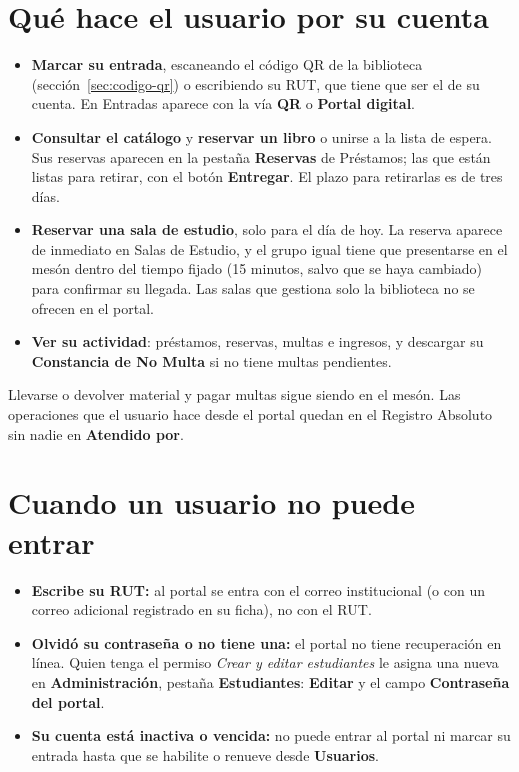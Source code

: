 \documentclass[11pt,a4paper]{report}
\begin{document}

\section{Qué hace el usuario por su cuenta}

\begin{itemize}
  \item \textbf{Marcar su entrada}, escaneando el código QR de la
  biblioteca (sección~\ref{sec:codigo-qr}) o escribiendo su RUT, que tiene
  que ser el de su cuenta. En Entradas aparece con la vía \textbf{QR} o
  \textbf{Portal digital}.
  \item \textbf{Consultar el catálogo} y \textbf{reservar un libro} o
  unirse a la lista de espera. Sus reservas aparecen en la pestaña
  \textbf{Reservas} de Préstamos; las que están listas para retirar, con el
  botón \textbf{Entregar}. El plazo para retirarlas es de tres días.
  \item \textbf{Reservar una sala de estudio}, solo para el día de hoy. La reserva aparece de inmediato en
  Salas de Estudio, y el grupo igual tiene que presentarse en el mesón
  dentro del tiempo fijado (15 minutos, salvo que se haya cambiado) para confirmar su llegada. Las salas que
  gestiona solo la biblioteca no se ofrecen en el portal.
  \item \textbf{Ver su actividad}: préstamos, reservas, multas e ingresos,
  y descargar su \textbf{Constancia de No Multa} si no tiene multas
  pendientes.
\end{itemize}

Llevarse o devolver material y pagar multas sigue siendo en el mesón. Las
operaciones que el usuario hace desde el portal quedan en el Registro
Absoluto sin nadie en \textbf{Atendido por}.

\section{Cuando un usuario no puede entrar}
\label{sec:portal-no-entra}

\begin{itemize}
  \item \textbf{Escribe su RUT:} al portal se entra con el correo
  institucional (o con un correo adicional registrado en su ficha), no con
  el RUT.
  \item \textbf{Olvidó su contraseña o no tiene una:} el portal no tiene
  recuperación en línea. Quien tenga el permiso \textit{Crear y editar
  estudiantes} le asigna una nueva en \textbf{Administración}, pestaña
  \textbf{Estudiantes}: \textbf{Editar} y el campo \textbf{Contraseña del
  portal}.
  \item \textbf{Su cuenta está inactiva o vencida:} no puede entrar al
  portal ni marcar su entrada hasta que se habilite o renueve desde
  \textbf{Usuarios}.
\end{itemize}
\end{document}
